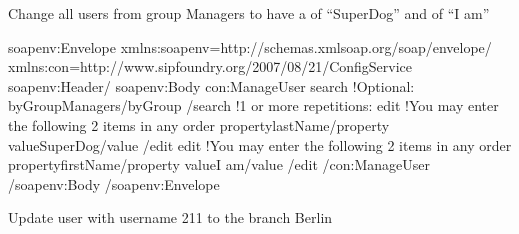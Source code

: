 \documentclass[letterpaper,10pt,english]{sphinxmanual}
\begin{document}
 Change all users from group Managers to have a  of “SuperDog” and  of “I am”

\begin{sphinxVerbatim}[commandchars=\\\{\}]
\PYGZlt{}soapenv:Envelope xmlns:soapenv=\PYGZdq{}http://schemas.xmlsoap.org/soap/envelope/\PYGZdq{} xmlns:con=\PYGZdq{}http://www.sipfoundry.org/2007/08/21/ConfigService\PYGZdq{}\PYGZgt{}
\PYGZlt{}soapenv:Header/\PYGZgt{}
\PYGZlt{}soapenv:Body\PYGZgt{}
\PYGZlt{}con:ManageUser\PYGZgt{}
\PYGZlt{}search\PYGZgt{}
\PYGZlt{}!\PYGZhy{}Optional:\PYGZhy{}\PYGZgt{}
\PYGZlt{}byGroup\PYGZgt{}Managers\PYGZlt{}/byGroup\PYGZgt{}
\PYGZlt{}/search\PYGZgt{}
\PYGZlt{}!\PYGZhy{}1 or more repetitions:\PYGZhy{}\PYGZgt{}
\PYGZlt{}edit\PYGZgt{}
\PYGZlt{}!\PYGZhy{}You may enter the following 2 items in any order\PYGZhy{}\PYGZgt{}
\PYGZlt{}property\PYGZgt{}lastName\PYGZlt{}/property\PYGZgt{}
\PYGZlt{}value\PYGZgt{}SuperDog\PYGZlt{}/value\PYGZgt{}
\PYGZlt{}/edit\PYGZgt{}
\PYGZlt{}edit\PYGZgt{}
\PYGZlt{}!\PYGZhy{}You may enter the following 2 items in any order\PYGZhy{}\PYGZgt{}
\PYGZlt{}property\PYGZgt{}firstName\PYGZlt{}/property\PYGZgt{}
\PYGZlt{}value\PYGZgt{}I am\PYGZlt{}/value\PYGZgt{}
\PYGZlt{}/edit\PYGZgt{}
\PYGZlt{}/con:ManageUser\PYGZgt{}
\PYGZlt{}/soapenv:Body\PYGZgt{}
\PYGZlt{}/soapenv:Envelope\PYGZgt{}
\end{sphinxVerbatim}

 Update user with username 211 to the branch Berlin

\begin{sphinxVerbatim}[commandchars=\\\{\}]
  
\end{sphinxVerbatim}
\end{document}
